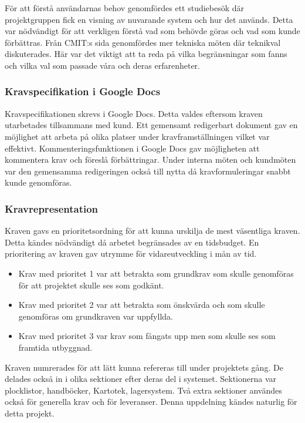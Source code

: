 \documentclass{article}
\begin{document}
För att förstå användarnas behov genomfördes ett studiebesök där projektgruppen fick en visning av nuvarande system och hur det används. Detta var nödvändigt för att verkligen förstå vad som behövde göras och vad som kunde förbättras. Från CMIT:s sida genomfördes mer tekniska möten där teknikval diskuterades. Här var det viktigt att ta reda på vilka begränsningar som fanns och vilka val som passade våra och deras erfarenheter.

\subsubsection{Kravspecifikation i Google Docs}
Kravspecifikationen skrevs i Google Docs. Detta valdes eftersom kraven utarbetades tillsammans med kund. Ett gemensamt redigerbart dokument gav en möjlighet att arbeta på olika platser under kravframställningen vilket var effektivt. Kommenteringsfunktionen i Google Docs gav möjligheten att kommentera krav och föreslå förbättringar. Under interna möten och kundmöten var den gemensamma redigeringen också till nytta då kravformuleringar snabbt kunde genomföras.

\subsubsection{Kravrepresentation}
Kraven gavs en prioritetsordning för att kunna urskilja de mest väsentliga kraven. Detta kändes nödvändigt då arbetet begränsades av en tidsbudget. En prioritering av kraven gav utrymme för vidareutveckling i mån av tid.
\begin{itemize}
\item Krav med prioritet 1 var att betrakta som grundkrav som skulle genomföras för att projektet skulle ses som godkänt.
\item Krav med prioritet 2 var att betrakta som önskvärda och som skulle genomföras om grundkraven var uppfyllda.
\item Krav med prioritet 3 var krav som fångats upp men som skulle ses som framtida utbyggnad. 
\end{itemize}  

Kraven numrerades för att lätt kunna refereras till under projektets gång. De delades också in i olika sektioner efter deras del i systemet. Sektionerna var plocklistor, handböcker, Kartotek, lagersystem. Två extra sektioner användes också för generella krav och för leveranser. Denna uppdelning kändes naturlig för detta projekt. 
\end{document}
